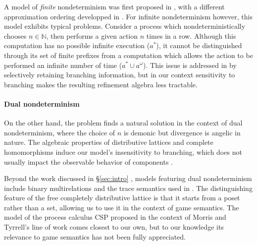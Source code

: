 \documentclass[sigplan,screen]{acmart}
\begin{document}
A model of \emph{finite} nondeterminism
was first proposed in \cite{gsfnd},
with a different approximation ordering
developped in \cite{gseia}.
For infinite nondeterminism however,
this model exhibits typical problems.
Consider a process which nondeterministically chooses $n \in \mathbb{N}$,
then performs a given action $n$ times in a row.
Although this computation has no possible infinite execution ($a^*$),
it cannot be distinguished through its set of finite prefixes
from a computation which allows the action to be performed an
infinite number of time ($a^* \cup a^\omega$).
This issue is addressed in \cite{gsndsheaves,nacgs}
by selectively retaining branching information,
but in our context sensitivity to branching makes
the resulting refinement algebra less tractable.


\paragraph{Dual nondeterminism}

On the other hand,
the problem finds a natural solution
in the context of dual nondeterminism,
where the choice of $n$ is demonic but
divergence is angelic in nature.
The algebraic properties of
distributive lattices and
complete homomorphisms
induce our model's insensitivity to branching,
which does not usually impact
the observable behavior of components \cite{bltsp}.

Beyond the work discussed in \S\ref{sec:intro}
\cite{gc,backthesis,refcal,augtyp,dndf},
models featuring dual nondeterminism include
binary multirelations \cite{multirel,mrdnd}
and the trace semantics used in \cite{altref}.
The distinguishing feature of
the free completely distributive lattice
is that it starts from a poset rather than a set,
allowing us to use it in the context of game semantics.
The model of the process calculus CSP
proposed \cite{cspdnd} in the context of Morris and Tyrrell's line of work
comes closest to our own,
but to our knowledge its relevance to game semantics
has not been fully appreciated.
\end{document}

